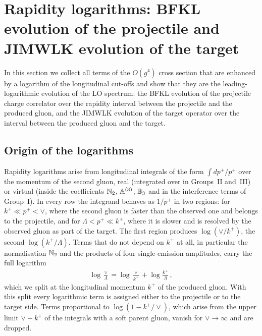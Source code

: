 \section{Rapidity logarithms: BFKL evolution of the projectile and JIMWLK evolution of the target}\label{sec:rapidity}


In this section we collect all terms of the $O(g^4)$ cross section that are enhanced by a logarithm of the longitudinal cut-offs and show that they are the leading-logarithmic evolution of the LO spectrum: the BFKL evolution of the projectile charge correlator over the rapidity interval between the projectile and the produced gluon, and the JIMWLK evolution of the target operator over the interval between the produced gluon and the target.

\subsection{Origin of the logarithms}\label{sec:loglong}

Rapidity logarithms arise from longitudinal integrals of the form $\int dp^+/p^+$ over the momentum of the second gluon, real (integrated over in Groups~II and~III) or virtual (inside the coefficients $\mathbb{N}_2$, $\mathbb{A}^{(3)}$, $\mathbb{B}_3$ and in the interference terms of Group~I). In every row the integrand behaves as $1/p^+$ in two regions: for $k^+\ll p^+<\vee$, where the second gluon is faster than the observed one and belongs to the projectile, and for $\Lambda<p^+\ll k^+$, where it is slower and is resolved by the observed gluon as part of the target. The first region produces $\log(\vee/k^+)$, the second $\log(k^+/\Lambda)$. Terms that do not depend on $k^+$ at all, in particular the normalisation $\mathbb{N}_2$ and the products of four single-emission amplitudes, carry the full logarithm
\begin{align}\label{eq:logsplit}
\log\frac{\vee}{\Lambda}=\log\frac{\vee}{k^+}+\log\frac{k^+}{\Lambda}\,,
\end{align}
which we split at the longitudinal momentum $k^+$ of the produced gluon. With this split every logarithmic term is assigned either to the projectile or to the target side. Terms proportional to $\log(1-k^+/\vee)$, which arise from the upper limit $\vee-k^+$ of the integrals with a soft parent gluon, vanish for $\vee\to\infty$ and are dropped.

